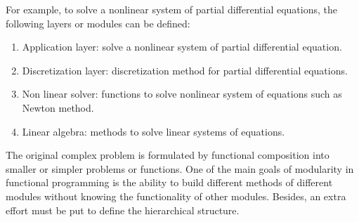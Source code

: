 For example, to solve a nonlinear system of partial differential equations, 
the following layers or modules can be defined: 
\begin{enumerate}
\setlength\itemsep{0cm}
\item Application layer: solve a nonlinear system of partial differential equation. 
\item Discretization layer: discretization method for partial differential equations.  
\item Non linear solver: functions to solve nonlinear system of equations 
such as Newton method.
\item Linear algebra:  methods to solve linear systems of equations. 
\end{enumerate}
The original complex problem is formulated by functional composition into smaller
or simpler problems or functions. 
One of the main goals of modularity in functional programming is the ability to 
build different methods of different modules without knowing the functionality of 
other modules. Besides, an extra effort must be put to define the hierarchical 
structure.  


 

 
 
  
%
% 
%  
%
%
%
%
%
% 
% 


\newpage  
